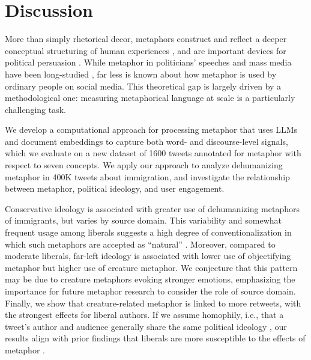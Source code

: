 \section{Discussion}


More than simply rhetorical decor, metaphors construct and reflect a deeper conceptual structuring of human experiences \citep{lakoff1980metaphors}, and are important devices for political persuasion \citep{mio_metaphor_1997}. While metaphor in politicians' speeches and mass media have been long-studied \citep{charteris-black_britain_2006}, far less is known about how metaphor is used by ordinary people on social media. This theoretical gap is largely driven by a methodological one: measuring metaphorical language at scale is a particularly challenging task.


We develop a computational approach for processing metaphor that uses LLMs and document embeddings to capture both word- and discourse-level signals, which we evaluate on a new dataset of 1600 tweets annotated for metaphor with respect to seven concepts. We apply our approach to analyze dehumanizing metaphor in 400K tweets about immigration, and investigate the relationship between metaphor, political ideology, and user engagement. 

Conservative ideology is associated with greater use of dehumanizing metaphors of immigrants, but varies by source domain. 
This variability and somewhat frequent usage among liberals suggests a high degree of conventionalization in which such metaphors are accepted as ``natural'' \citep{el2001metaphors}. Moreover, compared to moderate liberals, far-left ideology is associated with lower use of objectifying metaphor but higher use of creature metaphor. We conjecture that this pattern may be due to creature metaphors evoking stronger emotions, emphasizing the importance for future metaphor research to consider the role of source domain. Finally, we show that creature-related metaphor is linked to more retweets, with the strongest effects for liberal authors. 
If we assume homophily, i.e., that a tweet's author and audience generally share the same political ideology \citep{barbera2015tweeting}, our results align with prior findings that liberals are more susceptible to the effects of metaphor \citep{hart_riots_2018,sengupta-etal-2024-analyzing}. %



